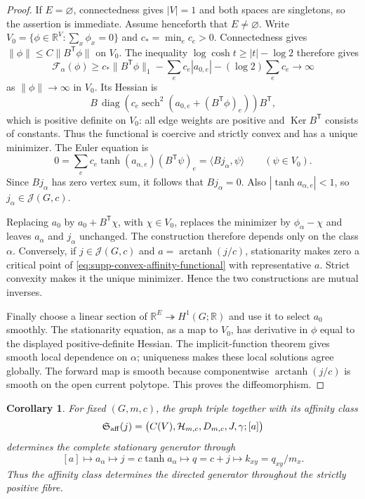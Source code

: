 \documentclass[11pt]{article}
\newtheorem{corollary}[corollary]{Corollary}
\theoremstyle{definition}
\theoremstyle{remark}
\theoremstyle{definition}
\theoremstyle{remark}
\newcommand{\Ker}{\operatorname{Ker}}
\newcommand{\diag}{\operatorname{diag}}
\newcommand{\Hh}{\mathcal H}
\begin{document}
\begin{proof}
If $E=\varnothing$, connectedness gives $|V|=1$ and both spaces are singletons,
so the assertion is immediate.  Assume henceforth that $E\ne\varnothing$.
Write $V_0=\{\phi\in\mathbb R^V:\sum_x\phi_x=0\}$ and
$c_* = \min_e c_e>0$.  Connectedness gives
$\|\phi\|\le C\|B^{\mathsf T}\phi\|$ on $V_0$.  The inequality
$\log\cosh t\ge |t|-\log2$ therefore gives
\[
 \mathcal F_\alpha(\phi)
 \ge c_*\|B^{\mathsf T}\phi\|_1
        -\sum_e c_e|a_{0,e}|-(\log2)\sum_e c_e
 \longrightarrow\infty
\]
as $\|\phi\|\to\infty$ in $V_0$.  Its Hessian is
\[
 B\,\diag\!\left(c_e\operatorname{sech}^2
  (a_{0,e}+(B^{\mathsf T}\phi)_e)\right)B^{\mathsf T},
\]
which is positive definite on $V_0$: all edge weights are positive and
$\Ker B^{\mathsf T}$ consists of constants.  Thus the functional is coercive and
strictly convex and has a unique minimizer.  The Euler equation is
\[
 0=\sum_ec_e\tanh(a_{\alpha,e})(B^{\mathsf T}\psi)_e
   =\langle Bj_\alpha,\psi\rangle\qquad(\psi\in V_0).
\]
Since $Bj_\alpha$ has zero vertex sum, it follows that $Bj_\alpha=0$.
Also $|\tanh a_{\alpha,e}|<1$, so $j_\alpha\in\mathcal J(G,c)$.

Replacing $a_0$ by $a_0+B^{\mathsf T}\chi$, with $\chi\in V_0$, replaces the
minimizer by $\phi_\alpha-\chi$ and leaves $a_\alpha$ and $j_\alpha$ unchanged.
The construction therefore depends only on the class $\alpha$.
Conversely, if $j\in\mathcal J(G,c)$ and
$a=\operatorname{arctanh}(j/c)$, stationarity makes zero a critical point of
\eqref{eq:supp-convex-affinity-functional} with representative $a$.
Strict convexity makes it the unique minimizer.  Hence the two constructions are
mutual inverses.

Finally choose a linear section of
$\mathbb R^E\twoheadrightarrow H^1(G;\mathbb R)$ and use it to select $a_0$
smoothly.  The stationarity equation, as a map to $V_0$, has derivative in
$\phi$ equal to the displayed positive-definite Hessian.  The implicit-function
theorem gives smooth local dependence on $\alpha$; uniqueness makes these local
solutions agree globally.  The forward map is smooth because componentwise
$\operatorname{arctanh}(j/c)$ is smooth on the open current polytope.
This proves the diffeomorphism.
\end{proof}

\begin{corollary}
\label{cor:supp-faithful-modular}
For fixed $(G,m,c)$, the graph triple together with its affinity class
\begin{equation}
 \mathfrak S_{\rm aff}(j)
 =\bigl(C(V),\Hh_{m,c},D_{m,c},J,\gamma;[a]\bigr)
 \label{eq:supp-modular-enrichment}
\end{equation}
determines the complete stationary generator through
\[
 [a]\longmapsto a_\alpha
 \longmapsto j=c\tanh a_\alpha
 \longmapsto q=c+j
 \longmapsto k_{xy}=q_{xy}/m_x.
\]
Thus the affinity class determines the directed generator throughout the strictly positive fibre.
\end{corollary}
\end{document}
